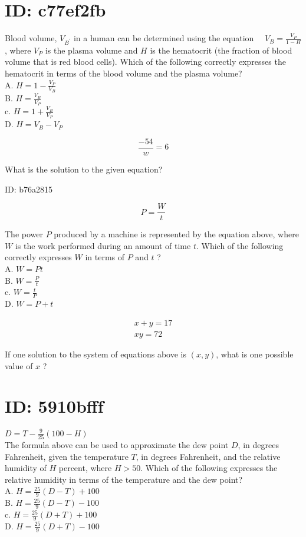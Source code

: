 \section*{ID: c77ef2fb}
Blood volume, $V_{B^{\prime}}$ in a human can be determined using the equation $\quad V_{B}=\frac{V_{P}}{1-H}$ , where $V_{P}$ is the plasma volume and $H$ is the hematocrit (the fraction of blood volume that is red blood cells). Which of the following correctly expresses the hematocrit in terms of the blood volume and the plasma volume?\\
A. $H=1-\frac{V_{P}}{V_{B}}$\\
B. $H=\frac{V_{B}}{V_{P}}$\\
c. $H=1+\frac{V_{B}}{V_{P}}$\\
D. $H=V_{B}-V_{P}$

$$
\frac{-54}{w}=6
$$

What is the solution to the given equation?

ID: b76a2815

$$
P=\frac{W}{t}
$$

The power $P$ produced by a machine is represented by the equation above, where $W$ is the work performed during an amount of time $t$. Which of the following correctly expresses $W$ in terms of $P$ and $t$ ?\\
A. $W=P t$\\
B. $W=\frac{P}{t}$\\
c. $W=\frac{t}{P}$\\
D. $W=P+t$

$$
\begin{array}{r}
x+y=17 \\
x y=72
\end{array}
$$

If one solution to the system of equations above is $(x, y)$, what is one possible value of $x$ ?

\section*{ID: 5910bfff}
$D=T-\frac{9}{25}(100-H)$\\
The formula above can be used to approximate the dew point $D$, in degrees Fahrenheit, given the temperature $T$, in degrees Fahrenheit, and the relative humidity of $H$ percent, where $H>50$. Which of the following expresses the relative humidity in terms of the temperature and the dew point?\\
A. $H=\frac{25}{9}(D-T)+100$\\
B. $H=\frac{25}{9}(D-T)-100$\\
c. $H=\frac{25}{9}(D+T)+100$\\
D. $H=\frac{25}{9}(D+T)-100$

